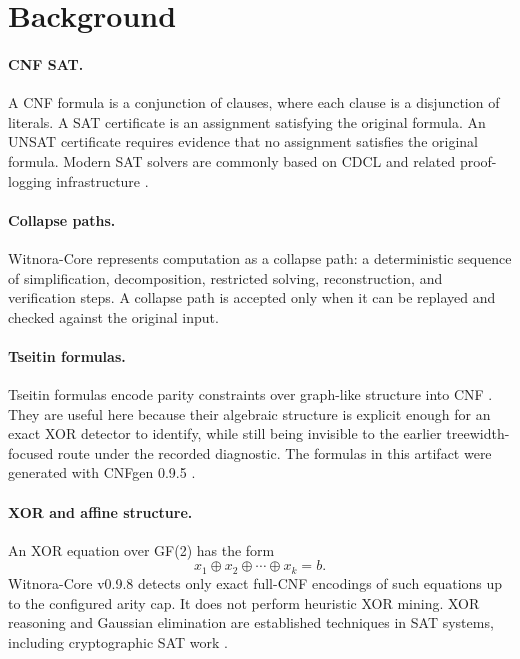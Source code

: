 \documentclass[10pt]{article}
\begin{document}
\section{Background}

\paragraph{CNF SAT.}
A CNF formula is a conjunction of clauses, where each clause is a disjunction
of literals. A SAT certificate is an assignment satisfying the original
formula. An UNSAT certificate requires evidence that no assignment satisfies
the original formula. Modern SAT solvers are commonly based on CDCL and related
proof-logging infrastructure \cite{marques1999grasp,bayardo1997lookback,moskewicz2001chaff,een2003minisat,biere2009handbook}.

\paragraph{Collapse paths.}
Witnora-Core represents computation as a collapse path: a deterministic
sequence of simplification, decomposition, restricted solving, reconstruction,
and verification steps. A collapse path is accepted only when it can be
replayed and checked against the original input.

\paragraph{Tseitin formulas.}
Tseitin formulas encode parity constraints over graph-like structure into CNF
\cite{tseitin1968}. They are useful here because their algebraic structure is
explicit enough for an exact XOR detector to identify, while still being
invisible to the earlier treewidth-focused route under the recorded diagnostic.
The formulas in this artifact were generated with CNFgen 0.9.5
\cite{cnfgen}.

\paragraph{XOR and affine structure.}
An XOR equation over GF(2) has the form
\[
  x_1 \oplus x_2 \oplus \cdots \oplus x_k = b .
\]
Witnora-Core v0.9.8 detects only exact full-CNF encodings of such equations up
to the configured arity cap. It does not perform heuristic XOR mining. XOR
reasoning and Gaussian elimination are established techniques in SAT systems,
including cryptographic SAT work \cite{soos2009cryptographic}.
\end{document}
